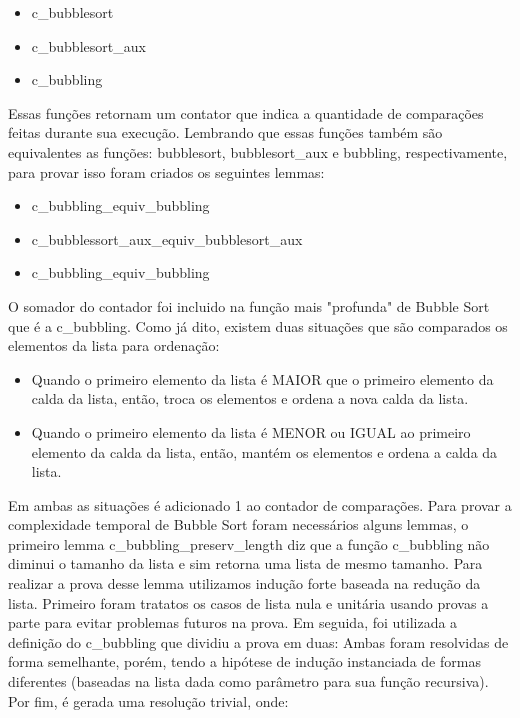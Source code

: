 \documentclass[12pt]{article}
\begin{document}
\begin{itemize}
    \item c\_bubblesort
    \item c\_bubblesort\_aux
    \item c\_bubbling
\end{itemize}

Essas funções retornam um contator que indica a quantidade de comparações feitas durante sua execução. Lembrando que essas funções também são equivalentes as funções: bubblesort, bubblesort\_aux e bubbling, respectivamente, para provar isso foram criados os seguintes lemmas:

\begin{itemize}
    \item c\_bubbling\_equiv\_bubbling
    \item c\_bubblessort\_aux\_equiv\_bubblesort\_aux
    \item c\_bubbling\_equiv\_bubbling
\end{itemize}

O somador do contador foi incluido na função mais "profunda" de Bubble Sort que é a c\_bubbling. Como já dito, existem duas situações que são comparados os elementos da lista para ordenação:

\begin{itemize}
    \item Quando o primeiro elemento da lista é MAIOR que o primeiro elemento da calda da lista, então, troca os elementos e ordena a nova calda da lista.
    \item Quando o primeiro elemento da lista é MENOR ou IGUAL ao primeiro elemento da calda da lista, então, mantém os elementos e ordena a calda da lista.
\end{itemize}

Em ambas as situações é adicionado 1 ao contador de comparações. 
\newpage 
Para provar a complexidade temporal de Bubble Sort foram necessários alguns lemmas, o primeiro lemma c\_bubbling\_preserv\_length diz que a função c\_bubbling não diminui o tamanho da lista e sim retorna uma lista de mesmo tamanho. Para realizar a prova desse lemma utilizamos indução forte baseada na redução da lista. Primeiro foram tratatos os casos de lista nula e unitária usando provas a parte para evitar problemas futuros na prova. Em seguida, foi utilizada a definição do c\_bubbling que dividiu a prova em duas: Ambas foram resolvidas de forma semelhante, porém, tendo a hipótese de indução instanciada de formas diferentes (baseadas na lista dada como parâmetro para sua função recursiva). Por fim, é gerada uma resolução trivial, onde:
\end{document}
